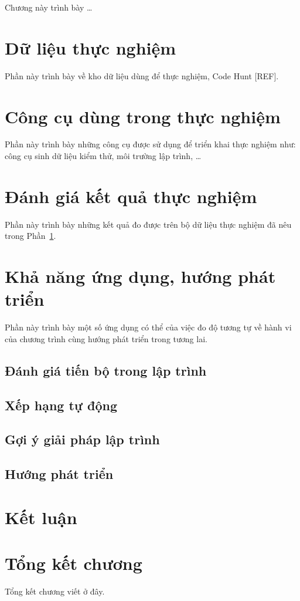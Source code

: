 Chương này trình bày \dots

\section{Dữ liệu thực nghiệm}
\label{sec:data}

Phần này trình bày về kho dữ liệu dùng để thực nghiệm, Code Hunt [REF].

\section{Công cụ dùng trong thực nghiệm}

Phần này trình bày những công cụ được sử dụng để triển khai thực nghiệm như: công cụ sinh dữ liệu kiểm thử, môi trường lập trình, \dots

\section{Đánh giá kết quả thực nghiệm}

Phần này trình bày những kết quả đo được trên bộ dữ liệu thực nghiệm đã nêu trong Phần~\ref{sec:data}.

\section{Khả năng ứng dụng, hướng phát triển}

Phần này trình bày một số ứng dụng có thể của việc đo độ tương tự về hành vi của chương trình cùng hướng phát triển trong tương lai.

\subsection{Đánh giá tiến bộ trong lập trình}

\subsection{Xếp hạng tự động}

\subsection{Gợi ý giải pháp lập trình}

\subsection{Hướng phát triển}

\section{Kết luận}

\section*{Tổng kết chương}

Tổng kết chương viết ở đây.


